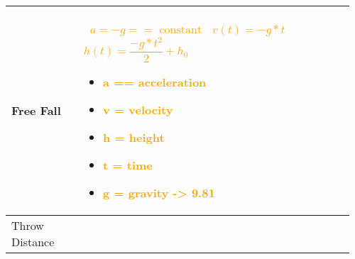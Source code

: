 \documentclass[main.tex,fontsize=8pt,paper=a4,paper=portrait,DIV=calc,]{scrartcl}
\begin{document}
\begin{table}[ht!]
\begin{tabular}{|m{0.2\linewidth}|m{0.755\linewidth}|}
\hline
Free Fall & 
\, \newline
\huge \textcolor{orange}{\( a = -g == \text{ constant} \)}\newline
\, \newline
\huge \textcolor{orange}{\(v(t) = -g * t\)}\newline
\, \newline
\huge \textcolor{orange}{\(h(t) = \dfrac{-g * t^2}{2} + h_0\)}\newline
\, \newline \normalsize
\begin{itemize}
\item \textcolor{orange}{a == acceleration}
\item \textcolor{orange}{v = velocity}
\item \textcolor{orange}{h = height}
\item \textcolor{orange}{t = time}
\item \textcolor{orange}{g = gravity -> 9.81}
\end{itemize} 
\\
\hline
Throw Distance & 


\hline
\end{tabular}
\end{table}
\end{document}
